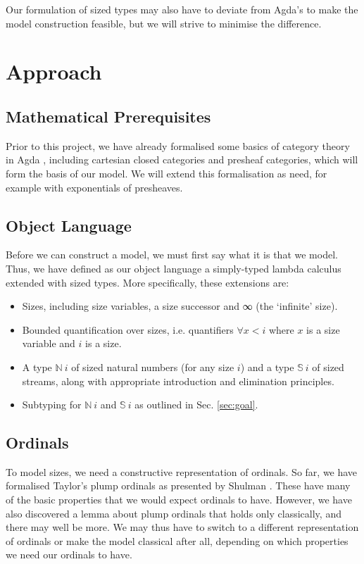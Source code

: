 \documentclass{scrartcl}
\begin{document}
Our formulation of sized types may also have to deviate from Agda's to make the
model construction feasible, but we will strive to minimise the difference.


\section{Approach}

\subsection{Mathematical Prerequisites}

Prior to this project, we have already formalised some basics of category theory
in Agda \cite{cats}, including cartesian closed categories and presheaf
categories, which will form the basis of our model. We will extend this
formalisation as need, for example with exponentials of presheaves.

\subsection{Object Language}

Before we can construct a model, we must first say what it is that we model.
Thus, we have defined as our object language a simply-typed lambda calculus
extended with sized types. More specifically, these extensions are:
\begin{itemize}
\item Sizes, including size variables, a size successor and ∞ (the
  \enquote*{infinite} size).
\item Bounded quantification over sizes, i.e. quantifiers $∀x<i$ where $x$ is
  a size variable and $i$ is a size.
\item A type $ℕ~i$ of sized natural numbers (for any size $i$) and a type $𝕊~i$
  of sized streams, along with appropriate introduction and elimination
  principles.
\item Subtyping for $ℕ~i$ and $𝕊~i$ as outlined in Sec. \ref{sec:goal}.
\end{itemize}

\subsection{Ordinals}

To model sizes, we need a constructive representation of ordinals. So far, we
have formalised Taylor's plump ordinals \cite{taylor1996} as presented by
Shulman \cite{shulman2014}. These have many of the basic properties that we
would expect ordinals to have. However, we have also discovered a lemma about
plump ordinals that holds only classically, and there may well be more. We may
thus have to switch to a different representation of ordinals or make the model
classical after all, depending on which properties we need our ordinals to have.
\end{document}
